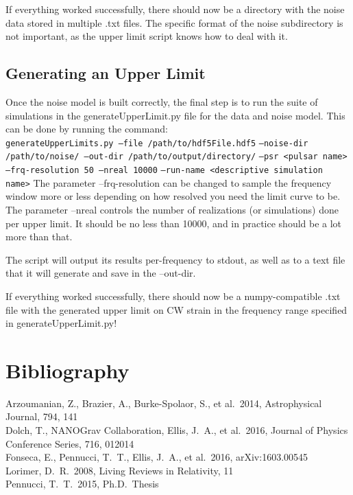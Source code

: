 \documentclass[12pt]{article}
\newcommand{\code}[1]{\colorbox{light-gray}{\texttt{#1}}}
\begin{document}
If everything worked successfully, there should now be a directory with the
noise data stored in multiple .txt files. The specific format of the noise
subdirectory is not important, as the upper limit script knows how to deal with
it.

\subsection{Generating an Upper Limit}

Once the noise model is built correctly, the final step is to run the suite of
simulations in the generateUpperLimit.py file for the data and noise model. This
can be done by running the command:
\\
\code{generateUpperLimits.py --file /path/to/hdf5File.hdf5}
\code{--noise-dir /path/to/noise/ --out-dir /path/to/output/directory/}
\code{--psr <pulsar name> --frq-resolution 50 --nreal 10000}
\code{--run-name <descriptive simulation name>}
The parameter --frq-resolution can be changed to sample the frequency window
more or less depending on how resolved you need the limit curve to be. The
parameter --nreal controls the number of realizations (or simulations) done per
upper limit. It should be no less than 10000, and in practice should be a lot
more than that.

The script will output its results per-frequency to stdout, as well as to a text
file that it will generate and save in the --out-dir. 

If everything worked successfully, there should now be a numpy-compatible .txt
file with the generated upper limit on CW strain in the frequency range
specified in generateUpperLimit.py!

\newpage
\section{Bibliography}
\noindent Arzoumanian, Z., Brazier, A., Burke-Spolaor, S., et al.\ 2014,
Astrophysical Journal, 794, 141
\\
\newline\noindent Dolch, T., NANOGrav Collaboration, Ellis, J.~A., et al.\ 2016,
Journal of Physics Conference Series, 716, 012014
\\
\newline\noindent Fonseca, E., Pennucci, T.~T., Ellis, J.~A., et al.\ 2016, arXiv:1603.00545 
\\
\newline\noindent Lorimer, D.~R.\ 2008, Living Reviews in Relativity, 11
\\
\newline\noindent Pennucci, T.~T.\ 2015, Ph.D.~Thesis
\\
\end{document}
